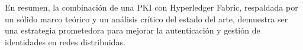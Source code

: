 \begin{conclusions}
    En resumen, la combinación de una PKI con Hyperledger Fabric, respaldada por un sólido marco teórico y un análisis crítico del estado del arte, demuestra ser una estrategia prometedora para mejorar la autenticación y gestión de identidades en redes distribuidas.
    
\end{conclusions}



